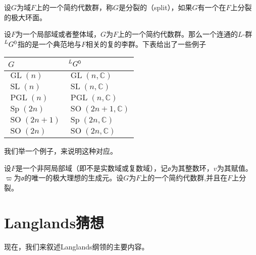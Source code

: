 \begin{definition}
设$G$为域$F$上的一个简约代数群，称$G$是分裂的（split），如果$G$有一个在$F$上分裂的极大环面。
\end{definition}

设$F$为一个局部域或者整体域，$G$为$F$上的一个简约代数群。那么一个连通的$L$-群$\prescript{L}{}{G}^0$指的是一个典范地与$F$相关的复的李群。下表给出了一些例子

\begin{table}[H]
\centering
\begin{tabular}{p{}p{}}
\toprule
$G$  & $\prescript{L}{}{G}^0$ \\
\midrule
$\operatorname{GL}(n)$ & $\operatorname{GL}(n, \mathbb{C})$ \\
$\operatorname{SL}(n)$ & $\operatorname{SL}(n, \mathbb{C})$ \\
$\operatorname{PGL}(n)$ & $\operatorname{PGL}(n, \mathbb{C})$ \\
$\operatorname{Sp}(2n)$ & $\operatorname{SO}(2n+1, \mathbb{C})$ \\
$\operatorname{SO}(2n+1)$ & $\operatorname{Sp}(2n, \mathbb{C})$ \\
$\operatorname{SO}(2n)$ & $\operatorname{SO}(2n, \mathbb{C})$ \\
\bottomrule
\end{tabular}
\end{table}

我们举一个例子，来说明这种对应。

\begin{example}
设$F$是一个非阿局部域（即不是实数域或复数域），记$\mathfrak{o}$为其整数环，$v$为其赋值。$ \varpi$为$\mathfrak{o}$的唯一的极大理想的生成元。设$G$为$F$上的一个简约代数群,并且在$F$上分裂。
\end{example}




\section{Langlands猜想}

现在，我们来叙述Langlands纲领的主要内容。
